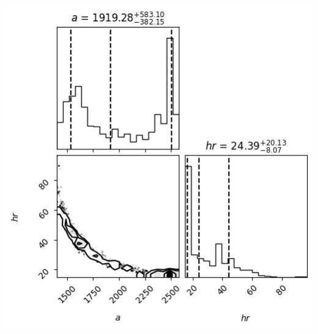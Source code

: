 \documentclass[12pt, letterpaper]{article}
\begin{document}
\includegraphics[scale=0.7]{4.jpg}
\end{document}
